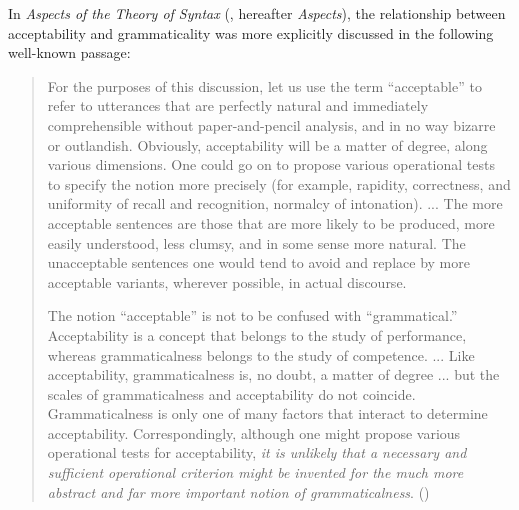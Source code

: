 
In \textit{Aspects of the Theory of Syntax} (\citet{Chomsky1965}, hereafter \textit{Aspects}), the relationship between acceptability and grammaticality was more explicitly discussed in the following well-known passage:

\begin{quote}
For the purposes of this discussion, let us use the term ``acceptable'' to refer to utterances that are perfectly natural and immediately comprehensible without paper-and-pencil analysis, and in no way bizarre or outlandish. Obviously, acceptability will be a matter of degree, along various dimensions. One could go on to propose various operational tests to specify the notion more precisely (for example, rapidity, correctness, and uniformity of recall and recognition, normalcy of intonation). ... The more acceptable sentences are those that are more likely to be produced, more easily understood, less clumsy, and in some sense more natural. The unacceptable sentences one would tend to avoid and replace by more acceptable variants, wherever possible, in actual discourse.

The notion ``acceptable'' is not to be confused with ``grammatical.'' Acceptability is a concept that belongs to the study of performance, whereas grammaticalness belongs to the study of competence. ... Like acceptability, grammaticalness is, no doubt, a matter of degree ... but the scales of grammaticalness and acceptability do not coincide. Grammaticalness is only one of many factors that interact to determine acceptability. Correspondingly, although one might propose various operational tests for acceptability, \textit{it is unlikely that a necessary and sufficient operational criterion might be invented for the much more abstract and far more important notion of grammaticalness}. ()
\end{quote}

